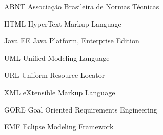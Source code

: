 \documentclass[
	12pt,				%
	openright,			%
	oneside,
	a4paper,			%
	english,			%
	french,				%
	spanish,			%
	brazil				%
	]{abntex2}
\begin{document}
\listoffigures*
\cleardoublepage


\listoftables*
\cleardoublepage


\begin{siglas}
  
  \item[ABNT] Associação Brasileira de Normas Técnicas
  
  \item[HTML] HyperText Markup Language
    
  \item[Java EE] Java Platform, Enterprise Edition

  \item[UML] Unified Modeling Language 

  \item[URL] Uniform Resource Locator
    
  \item[XML] eXtensible Markup Language
  
  \item[GORE] Goal Oriented Requirements Engineering
  
  \item[EMF] Eclipse Modeling Framework
  
  
\end{siglas}



\tableofcontents*
\cleardoublepage




\textual








\end{document}
